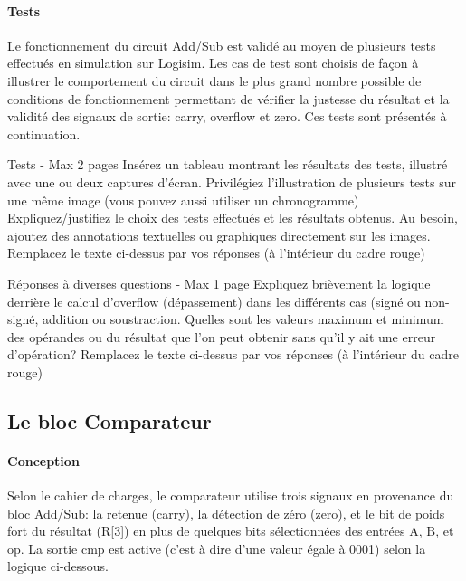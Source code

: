 \documentclass[a4paper]{article}
\begin{document}
\paragraph{Tests} 
Le fonctionnement du circuit Add/Sub est validé au moyen de plusieurs tests effectués en  simulation sur Logisim. Les cas de test sont choisis de façon à illustrer le comportement du circuit dans le plus grand nombre possible de conditions de fonctionnement permettant de vérifier la justesse du résultat et la validité des signaux de sortie: carry, overflow et zero. Ces tests sont présentés à continuation.

\begin{tcolorbox}[colframe=Monokaimagenta,colback=white]
Tests - Max 2 pages 
Insérez  un tableau montrant les résultats des tests, illustré avec une ou deux captures d’écran. Privilégiez l’illustration de plusieurs tests sur une même image (vous pouvez aussi utiliser un chronogramme)
Expliquez/justifiez le choix des tests effectués et les résultats obtenus.
Au besoin, ajoutez des annotations textuelles ou graphiques directement sur les images.
Remplacez le texte ci-dessus par vos réponses (à l’intérieur du cadre rouge)
\end{tcolorbox}

\begin{tcolorbox}[colframe=Monokaimagenta,colback=white]
Réponses à diverses questions - Max 1 page
Expliquez brièvement la logique derrière le calcul d’overflow (dépassement) dans les différents cas (signé ou non-signé, addition ou soustraction.
Quelles sont les valeurs maximum et minimum des opérandes ou du résultat que l’on peut obtenir sans qu’il y ait une erreur d’opération?
Remplacez le texte ci-dessus par vos réponses (à l’intérieur du cadre rouge)


\end{tcolorbox}

\subsection{Le bloc Comparateur}
\label{comp}
\paragraph{Conception} Selon le cahier de charges, le comparateur utilise trois signaux en provenance du bloc Add/Sub: la retenue (carry), la détection de zéro (zero), et le bit de poids fort du résultat (R[3]) en plus de quelques bits sélectionnées des entrées A, B, et op. La sortie cmp est active (c’est à dire d’une valeur égale à 0001) selon la logique ci-dessous.
\end{document}
